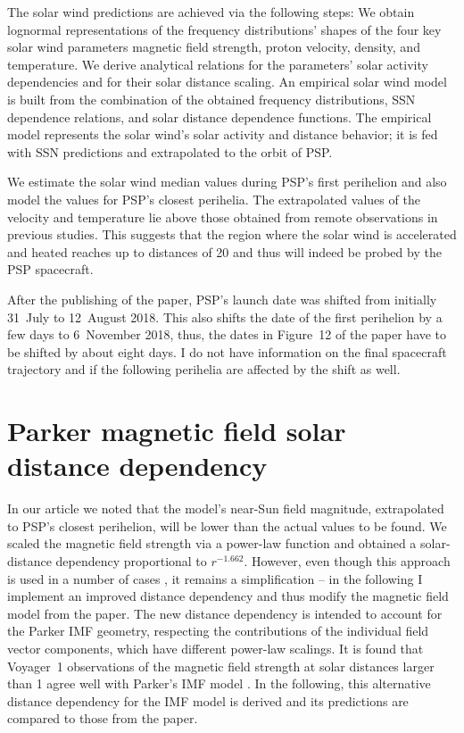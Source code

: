 The solar wind predictions are achieved via the following steps: We obtain lognormal representations of the frequency distributions’ shapes of the four key solar wind parameters magnetic field strength, proton velocity, density, and temperature. We derive analytical relations for the parameters’ solar activity dependencies and for their solar distance scaling. An empirical solar wind model is built from the combination of the obtained frequency distributions, SSN dependence relations, and solar distance dependence functions. The empirical model represents the solar wind’s solar activity and distance behavior; it is fed with SSN predictions and extrapolated to the orbit of PSP.

We estimate the solar wind median values during PSP’s first perihelion and also model the values for PSP’s closest perihelia. The extrapolated values of the velocity and temperature lie above those obtained from remote observations in previous studies. This suggests that the region where the solar wind is accelerated and heated reaches up to distances of \SI{20}{\Rs} and thus will indeed be probed by the PSP spacecraft.

After the publishing of the paper, PSP's launch date was shifted from initially 31~July to 12~August 2018. This also shifts the date of the first perihelion by a few days to 6~November 2018, thus, the dates in Figure~12 of the paper have to be shifted by about eight days. I do not have information on the final spacecraft trajectory and if the following perihelia are affected by the shift as well.


\section{Parker magnetic field solar distance dependency}
\label{sec:Parker_IMF_solar_distance_dependency}
In our article we noted that the model's near-Sun field magnitude, extrapolated to PSP's closest perihelion, will be lower than the actual values to be found. We scaled the magnetic field strength via a power-law function and obtained a solar-distance dependency proportional to $r^{-1.662}$. However, even though this approach is used in a number of cases \citep[e.g.,][]{Coleman1969,Hellinger2013}, it remains a simplification -- in the following I implement an improved distance dependency and thus modify the magnetic field model from the paper. The new distance dependency is intended to account for the Parker IMF geometry, respecting the contributions of the individual field vector components, which have different power-law scalings. It is found that Voyager~1 observations of the magnetic field strength at solar distances larger than \SI{1}{\au} agree well with Parker’s IMF model \citep{Burlaga1984,Burlaga2002}. In the following, this alternative distance dependency for the IMF model is derived and its predictions are compared to those from the paper.

